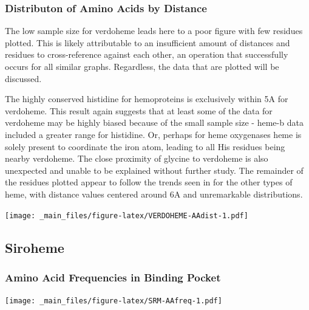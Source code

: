 \documentclass[a4paper, nobind]{templates/ociamthesis}
\let\origfigure\figure
\let\endorigfigure\endfigure
\renewenvironment{figure}[1][2] {
    \expandafter\origfigure\expandafter[H]
} {
    \endorigfigure
}
\begin{document}
\hypertarget{distributon-of-amino-acids-by-distance-2}{%
\subsubsection{Distributon of Amino Acids by Distance}\label{distributon-of-amino-acids-by-distance-2}}

The low sample size for verdoheme leads here to a poor figure with few residues plotted. This is likely attributable to an insufficient amount of distances and residues to cross-reference against each other, an operation that successfully occurs for all similar graphs. Regardless, the data that are plotted will be discussed.

The highly conserved histidine for hemoproteins is exclusively within 5A for verdoheme. This result again suggests that at least some of the data for verdoheme may be highly biased because of the small sample size - heme-b data included a greater range for histidine. Or, perhaps for heme oxygenases heme is solely present to coordinate the iron atom, leading to all His residues being nearby verdoheme. The close proximity of glycine to verdoheme is also unexpected and unable to be explained without further study. The remainder of the residues plotted appear to follow the trends seen in for the other types of heme, with distance values centered around 6A and unremarkable distributions.

\begin{figure}
\centering
\texttt{[image: \_main\_files/figure-latex/VERDOHEME-AAdist-1.pdf]}
\caption{\label{fig:VERDOHEME-AAdist}VERDOHEME: Residue Distribution by Distance}
\end{figure}

\hypertarget{siroheme-1}{%
\subsection{Siroheme}\label{siroheme-1}}

\hypertarget{amino-acid-frequencies-in-binding-pocket-3}{%
\subsubsection{Amino Acid Frequencies in Binding Pocket}\label{amino-acid-frequencies-in-binding-pocket-3}}

\begin{figure}
\centering
\texttt{[image: \_main\_files/figure-latex/SRM-AAfreq-1.pdf]}
\caption{\label{fig:SRM-AAfreq}SRM: AA Frequency within 7A}
\end{figure}
\end{document}
